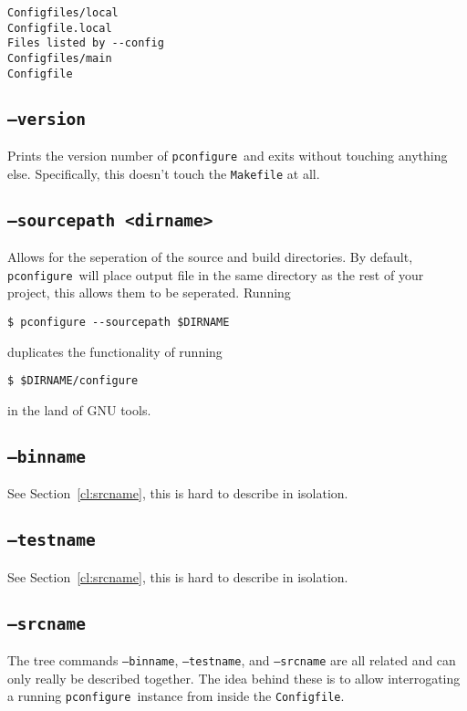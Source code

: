 \documentclass{article}
\newcommand{\pconfigure}{\texttt{pconfigure}}
\begin{document}
\begin{verbatim}
Configfiles/local
Configfile.local
Files listed by --config
Configfiles/main
Configfile
\end{verbatim}

\subsection{\texttt{--version}}

Prints the version number of \pconfigure\ and exits without touching
anything else.  Specifically, this doesn't touch the \texttt{Makefile}
at all.

\subsection{\texttt{--sourcepath <dirname>}}

Allows for the seperation of the source and build directories.  By
default, \pconfigure\ will place output file in the same directory as
the rest of your project, this allows them to be seperated.  Running
\begin{verbatim}
$ pconfigure --sourcepath $DIRNAME
\end{verbatim}
duplicates the functionality of running
\begin{verbatim}
$ $DIRNAME/configure
\end{verbatim}
in the land of GNU tools.

\subsection{\texttt{--binname}}

See Section~\ref{cl:srcname}, this is hard to describe in isolation.

\subsection{\texttt{--testname}}

See Section~\ref{cl:srcname}, this is hard to describe in isolation.

\subsection{\texttt{--srcname} \label{cl:srcname}}

The tree commands \texttt{--binname}, \texttt{--testname}, and
\texttt{--srcname} are all related and can only really be described
together.  The idea behind these is to allow interrogating a running
\pconfigure\ instance from inside the \texttt{Configfile}.
\end{document}
